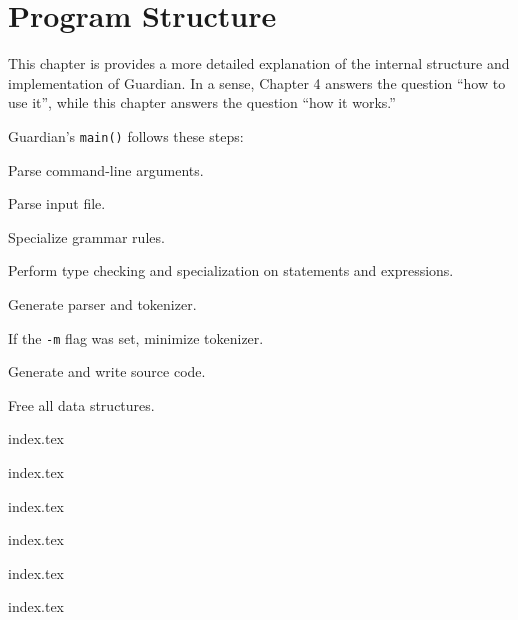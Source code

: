 
\chapter{Program Structure}
{
	This chapter is provides a more detailed explanation of the
	internal structure and implementation of Guardian.
	In a sense, Chapter 4 answers the question ``how to use it'',
	while this chapter answers the question ``how it works.''
	
	Guardian's \texttt{main()} follows these steps:
	\begin{enumerate}
	{
		\item Parse command-line arguments.
		
		\item Parse input file.
		
		\item Specialize grammar rules.
		
		\item Perform type checking and specialization on statements and expressions.
		
		\item Generate parser and tokenizer.
		
		\item If the \texttt{-m} flag was set, minimize tokenizer.
		
		\item Generate and write source code.
			
		\item Free all data structures.
	}
	\end{enumerate}
	
	{index.tex}
	
	{index.tex}
	
	{index.tex}
	
	{index.tex}
	
	{index.tex}
	
	{index.tex}
}

